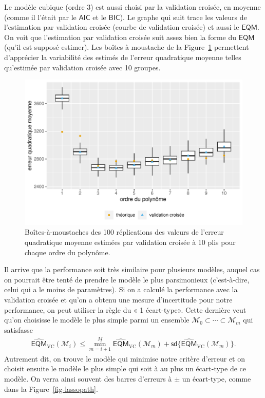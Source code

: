 \documentclass[
  11pt,
  letterpaper,
]{scrbook}
\theoremstyle{definition}
\theoremstyle{remark}
\begin{document}
Le modèle cubique (ordre 3) est aussi choisi par la validation croisée,
en moyenne (comme il l'était par le \(\mathsf{AIC}\) et le
\(\mathsf{BIC}\)). Le graphe qui suit trace les valeurs de l'estimation
par validation croisée (courbe de validation croisée) et aussi le
\(\mathsf{EQM}\). On voit que l'estimation par validation croisée suit
assez bien la forme du \(\mathsf{EQM}\) (qu'il est supposé estimer). Les
boîtes à moustache de la Figure~\ref{fig-plotcv} permettent d'apprécier
la variabilité des estimés de l'erreur quadratique moyenne telles
qu'estimée par validation croisée avec 10 groupes.

\begin{figure}[ht!]

{\centering \includegraphics[width=1\textwidth,height=\textheight]{./04-selectionmodeles_files/figure-pdf/fig-plotcv-1.pdf}

}

\caption{\label{fig-plotcv}Boîtes-à-moustaches des 100 réplications des
valeurs de l'erreur quadratique moyenne estimées par validation croisée
à 10 plis pour chaque ordre du polynôme.}

\end{figure}

Il arrive que la performance soit très similaire pour plusieurs modèles,
auquel cas on pourrait être tenté de prendre le modèle le plus
parsimonieux (c'est-à-dire, celui qui a le moins de paramètres). Si on a
calculé la performance avec la validation croisée et qu'on a obtenu une
mesure d'incertitude pour notre performance, on peut utiliser la règle
du « 1 écart-type». Cette dernière veut qu'on choisisse le modèle le
plus simple parmi un ensemble
\(\mathcal{M}_0 \subset\cdots \subset \mathcal{M}_m\) qui satisfasse
\begin{align*}
\widehat{\mathsf{EQM}}_{\text{VC}}(\mathcal{M}_i) \leq \min_{m = i+1}^M \widehat{\mathsf{EQM}}_{\text{VC}}(\mathcal{M}_m) + \mathsf{sd}\{\widehat{\mathsf{EQM}}_{\text{VC}}(\mathcal{M}_m)\}.
\end{align*} Autrement dit, on trouve le modèle qui minimise notre
critère d'erreur et on choisit ensuite le modèle le plus simple qui soit
à au plus un écart-type de ce modèle. On verra ainsi souvent des barres
d'erreurs à \(\pm\) un écart-type, comme dans la
Figure~\ref{fig-lassopath}.
\end{document}
